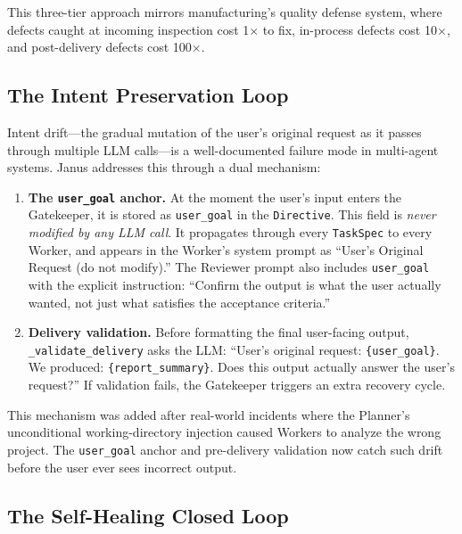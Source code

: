 \documentclass[11pt,a4paper]{article}
\begin{document}
This three-tier approach mirrors manufacturing's quality defense system, where
defects caught at incoming inspection cost 1$\times$ to fix, in-process defects
cost 10$\times$, and post-delivery defects cost 100$\times$.

\subsection{The Intent Preservation Loop}
\label{sec:intent-loop}

Intent drift---the gradual mutation of the user's original request as it
passes through multiple LLM calls---is a well-documented failure mode in
multi-agent systems. Janus addresses this through a dual mechanism:

\begin{enumerate}[leftmargin=*,itemsep=2pt]
    \item \textbf{The \texttt{user\_goal} anchor.} At the moment the user's
    input enters the Gatekeeper, it is stored as \texttt{user\_goal} in the
    \texttt{Directive}. This field is \emph{never modified by any LLM call}.
    It propagates through every \texttt{TaskSpec} to every Worker, and appears
    in the Worker's system prompt as ``User's Original Request (do not
    modify).'' The Reviewer prompt also includes \texttt{user\_goal} with the
    explicit instruction: ``Confirm the output is what the user actually
    wanted, not just what satisfies the acceptance criteria.''

    \item \textbf{Delivery validation.} Before formatting the final user-facing
    output, \texttt{\_validate\_delivery} asks the LLM: ``User's original
    request: \texttt{\{user\_goal\}}. We produced: \texttt{\{report\_summary\}}.
    Does this output actually answer the user's request?'' If validation fails,
    the Gatekeeper triggers an extra recovery cycle.
\end{enumerate}

This mechanism was added after real-world incidents where the Planner's
unconditional working-directory injection caused Workers to analyze the wrong
project. The \texttt{user\_goal} anchor and pre-delivery validation now catch
such drift before the user ever sees incorrect output.

\subsection{The Self-Healing Closed Loop}
\end{document}
